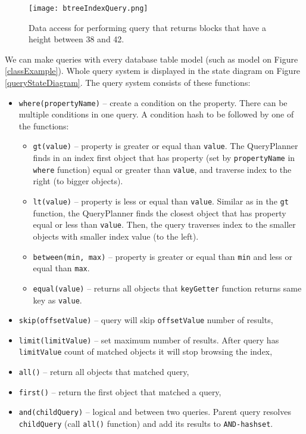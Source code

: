 \begin{figure}[h]
    \centering
    \texttt{[image: btreeIndexQuery.png]}
    \caption{Data access for performing query that returns blocks that have a height between 38 and 42.}
    \label{btreeQuery}
\end{figure}


We can make queries with every database table model (such as model on Figure \ref{classExample}). Whole query system is displayed in the state diagram on Figure \ref{queryStateDiagram}. The query system consists of these functions: 
\begin{itemize}
    \item \texttt{where(propertyName)} -- create a condition on the property. There can be multiple conditions in one query. A condition hash to be followed by one of the functions: 
    \begin{itemize}
        \item \texttt{gt(value)} -- property is greater or equal than \texttt{value}. The QueryPlanner finds in an index first object that has property (set by \texttt{propertyName} in \texttt{where} function) equal or greater than \texttt{value}, and traverse index to the right (to bigger objects).
        \item \texttt{lt(value)} -- property is less or equal than \texttt{value}. Similar as in the \texttt{gt} function, the QueryPlanner finds the closest object that has property equal or less than \texttt{value}. Then, the query traverses index to the smaller objects with smaller index value (to the left).
        \item \texttt{between(min, max)} -- property is greater or equal than \texttt{min} and less or equal than \texttt{max}. 
        \item \texttt{equal(value)} -- returns all objects that \texttt{keyGetter} function returns same key as \texttt{value}. 
    \end{itemize}
    \item \texttt{skip(offsetValue)} -- query will skip \texttt{offsetValue} number of results,
    \item \texttt{limit(limitValue)} -- set maximum number of results. After query has \texttt{limitValue} count of matched objects it will stop browsing the index,
    \item \texttt{all()} -- return all objects that matched query,
    \item \texttt{first()} -- return the first object that matched a query,
    \item \texttt{and(childQuery)} -- logical and between two queries. Parent query resolves \texttt{childQuery} (call \texttt{all()} function) and add its results to \texttt{AND-hashset}.

\end{itemize}
